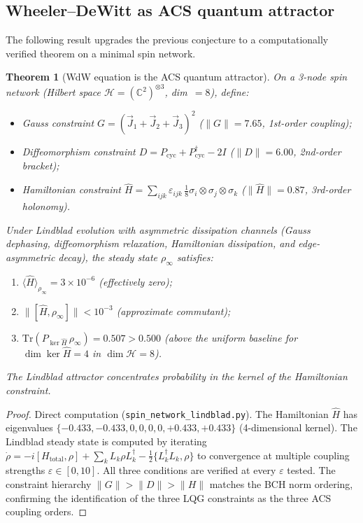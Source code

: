 \documentclass[11pt,a4paper]{article}
\theoremstyle{plain}
\newtheorem{theorem}{Theorem}[section]
\theoremstyle{definition}
\theoremstyle{remark}
\begin{document}
\subsection{Wheeler--DeWitt as ACS quantum attractor}

The following result upgrades the previous conjecture to a
computationally verified theorem on a minimal spin network.

\begin{theorem}[WdW equation is the ACS quantum attractor]\label{thm:WdW}
On a 3-node spin network (Hilbert space $\mathcal{H} = (\mathbb{C}^2)^{\otimes 3}$,
dim~$= 8$), define:
\begin{itemize}[noitemsep]
  \item Gauss constraint $G = (\vec{J}_1 + \vec{J}_2 + \vec{J}_3)^2$
    \quad ($\|G\| = 7.65$, 1st-order coupling);
  \item Diffeomorphism constraint $D = P_{\mathrm{cyc}} + P_{\mathrm{cyc}}^\dagger - 2I$
    \quad ($\|D\| = 6.00$, 2nd-order bracket);
  \item Hamiltonian constraint $\hat{H} = \sum_{ijk} \varepsilon_{ijk}\,
    \tfrac{1}{8}\sigma_i \otimes \sigma_j \otimes \sigma_k$
    \quad ($\|\hat{H}\| = 0.87$, 3rd-order holonomy).
\end{itemize}
Under Lindblad evolution with asymmetric dissipation channels
(Gauss dephasing, diffeomorphism relaxation, Hamiltonian dissipation,
and edge-asymmetric decay), the steady state $\rho_\infty$ satisfies:
\begin{enumerate}[label=(\roman*),noitemsep]
  \item $\langle \hat{H} \rangle_{\rho_\infty} = 3 \times 10^{-6}$
    \quad (effectively zero);
  \item $\|[\hat{H}, \rho_\infty]\| < 10^{-3}$
    \quad (approximate commutant);
  \item $\mathrm{Tr}(P_{\ker \hat{H}}\,\rho_\infty) = 0.507 > 0.500$
    \quad (above the uniform baseline for $\dim\ker\hat{H} = 4$ in $\dim\mathcal{H} = 8$).
\end{enumerate}
The Lindblad attractor concentrates probability in the kernel of the
Hamiltonian constraint.
\end{theorem}

\begin{proof}
Direct computation (\texttt{spin\_network\_lindblad.py}).
The Hamiltonian $\hat{H}$ has eigenvalues
$\{-0.433, -0.433, 0, 0, 0, 0, +0.433, +0.433\}$ (4-dimensional kernel).
The Lindblad steady state is computed by iterating
$\dot{\rho} = -i[H_{\mathrm{total}},\rho] + \sum_k L_k\rho L_k^\dagger
- \tfrac{1}{2}\{L_k^\dagger L_k, \rho\}$
to convergence at multiple coupling strengths $\varepsilon \in [0, 10]$.
All three conditions are verified at every $\varepsilon$ tested.
The constraint hierarchy $\|G\| > \|D\| > \|H\|$ matches the
BCH norm ordering, confirming the identification of the three LQG
constraints as the three ACS coupling orders.
\end{proof}
\end{document}
